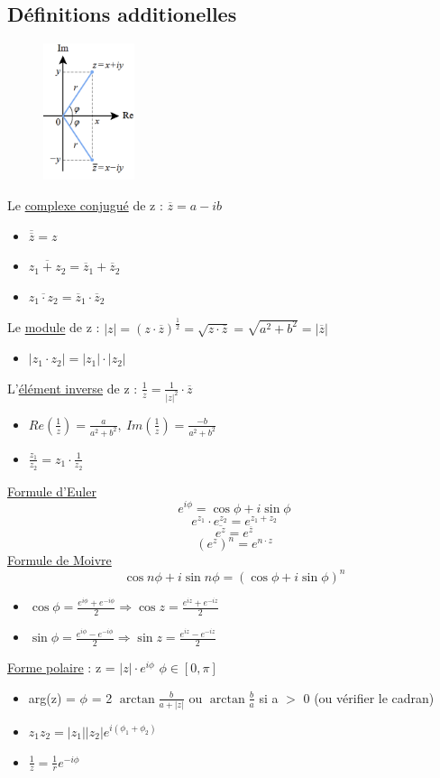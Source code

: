 \documentclass{article}
\begin{document}
\subsection{Définitions additionelles}
\begin{figure}[htp]
    \centering
    \includegraphics[height=4cm]{Images/conjugue.png}
    \label{fig:conjugue}
\end{figure}
Le \underline{complexe conjugué} de z : \( \overline{z} = a - ib\) \\
\begin{itemize}
    \item \( \overline{\overline{z}} = z \)
    \item \( \overline{z_1 + z_2} = \overline{z}_1+ \overline{z}_2 \)
    \item \( \overline{z_1 \cdot z_2} = \overline{z}_1 \cdot \overline{z}_2 \)
\end{itemize} \newpage
Le \underline{module} de z : \(|z| = (z\cdot\overline{z})^{\frac{1}{2}} = \sqrt{z\cdot\overline{z}} = \sqrt{a^2 + b^2} = |\overline{z}|\)
\begin{itemize}
    \item \( |z_1 \cdot z_2| = |z_1|\cdot|z_2| \)
\end{itemize}
L'\underline{élément inverse} de z : \(\frac{1}{z} = \frac{1}{|z|^2}\cdot\overline{z}\)
\begin{itemize}
    \item \(Re(\frac{1}{z}) = \frac{a}{a^2 + b^2}, \ Im(\frac{1}{z}) = \frac{-b}{a^2 + b^2} \)
    \item \( \frac{z_1}{z_2} = z_1 \cdot \frac{1}{z_2} \)
\end{itemize}
\underline{Formule d'Euler}
\[ e^{i\phi} = \cos{\phi} + i\sin{\phi} \]
\[ e^{z_1} \cdot e^{z_2} = e^{z_1 + z_2} \]
\[ \overline{e^z} = e^{\overline{z}} \]
\[ (e^z)^n = e^{n\cdot z} \]
\underline{Formule de Moivre}
\[ \cos{n\phi} + i\sin{n\phi} = (\cos{\phi} + i\sin{\phi})^n \]
\begin{itemize}
    \item \( \cos{\phi} = \frac{e^{i\phi} + e^{-i\phi}}{2} \Rightarrow \cos{z} = \frac{e^{iz} + e^{-iz}}{2} \)
    \item \( \sin{\phi} = \frac{e^{i\phi} - e^{-i\phi}}{2} \Rightarrow \sin{z} = \frac{e^{iz} - e^{-iz}}{2} \)
\end{itemize}
\underline{Forme polaire} : z = \( |z|\cdot e^{i\phi} \) \qquad \qquad \qquad \( \phi \in [0, \pi]\)
\begin{itemize}
    \item arg(z) = \(\phi\) = 2 \( \arctan{\frac{b}{a + |z|}} \) ou \( \arctan{\frac{b}{a}}\) si a $>$ 0 (ou vérifier le cadran)
    \item \( z_1z_2 = |z_1||z_2|e^{i(\phi_1 + \phi_2)} \)
    \item \( \frac{1}{z} = \frac{1}{r}e^{-i\phi} \)
\end{itemize}
\end{document}
